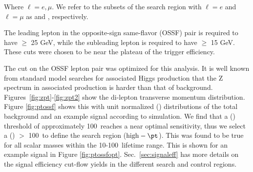 Where $\ell = e, \mu$. We refer to the subsets of the search region with
$\ell = e$ and  $\ell = \mu$ as \twoelezh and \twomuzh, respectively.

The leading lepton in the opposite-sign same-flavor (OSSF) pair is required to have \pt $\geq$ 25 GeV,
while the subleading lepton is required to have \pt $\geq$ 15 GeV.
These cuts were chosen to be near the plateau of the trigger efficiency.

The \pt cut on the OSSF lepton pair was optimized for this analysis.
It is well known from standard model searches for associated Higgs production that the Z spectrum
in associated production is harder than that of background. Figures~\ref{fig:zpt}-\ref{fig:zpt2} show
the di-lepton transverse momentum distribution.
Figure \ref{fig:ptossf} shows this with unit normalized \pt(\dilepton) distributions of the total background
and an example signal according to simulation.
We find that a \pt(\dilepton) threshold of approximately 100~\GeV reaches a near
 optimal sensitivity, thus we select a \pt(\dilepton) $>$ 100~\GeV to define the
  search region ($\mathrm{high-\pt}$).
This was found to be true for all scalar masses within the 10-100~\mm lifetime range.
This is shown for an example signal in Figure \ref{fig:ptossfopt}. Sec.~\ref{sec:signaleff}
has more details on the signal efficiency cut-flow yields in the different search
 and control regions.


